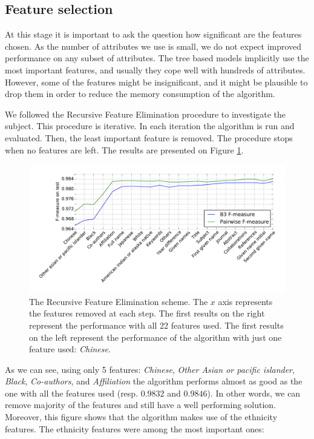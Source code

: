 \documentclass{pracamgr}
\begin{document}
\subsection{Feature selection}
At this stage it is important to ask the question how significant are the features chosen.
As the number of attributes we use is small, we do not expect improved performance on
any subset of attributes. The tree based models implicitly use the most important features,
and usually they cope well with hundreds of attributes. However, some of the features might be
insignificant, and it might be
plausible to drop them in order to reduce the memory consumption of the algorithm.

We followed the Recursive Feature Elimination \citep{Guyon2002} procedure to investigate
the subject. This procedure is iterative. In each iteration the algorithm is run and
evaluated. Then, the least important feature is removed. The procedure stops when no
features are left. The results are presented on Figure \ref{fig:rfe}.


\begin{figure}[th!]
\includegraphics[width=\textwidth]{figures/fig-rfe}
\caption{The Recursive Feature Elimination scheme. The $x$ axis represents
the features removed at each step. The first results on the right represent
the performance with all 22 features used. The first results on the
left represent the performance of the algorithm with just one feature used:
\textit{Chinese}.}
\label{fig:rfe}
\end{figure}

As we can see, using only 5 features: \textit{Chinese},
\textit{Other Asian or pacific islander}, \textit{Black}, \textit{Co-authors},
and \textit{Affiliation} the algorithm performs almost as good as the one with all
the features used (resp. $0.9832$ and $0.9846$). In other words,
we can remove majority of the features and still have a well performing solution.
Moreover, this figure shows
that the algorithm makes use of the ethnicity features. The ethnicity features
were among the most important ones:
\end{document}
